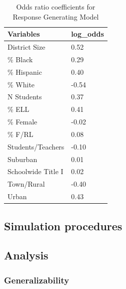 \documentclass[man,floatsintext]{apa6}
\begin{document}
\begin{table}[tbp]
\begin{center}
\begin{threeparttable}
\caption{\label{tab:tab-RGM-Pars}Odds ratio coefficients for Response Generating Model}
\begin{tabular}{ll}
\toprule
Variables & \multicolumn{1}{c}{log\_odds}\\
\midrule
District Size & 0.52\\
\% Black & 0.29\\
\% Hispanic & 0.40\\
\% White & -0.54\\
N Students & 0.37\\
\% ELL & 0.41\\
\% Female & -0.02\\
\% F/RL & 0.08\\
Students/Teachers & -0.10\\
Suburban & 0.01\\
Schoolwide Title I & 0.02\\
Town/Rural & -0.40\\
Urban & 0.43\\
\bottomrule
\end{tabular}
\end{threeparttable}
\end{center}
\end{table}



\hypertarget{simulation-procedures}{%
\subsection{Simulation procedures}\label{simulation-procedures}}


\hypertarget{analysis}{%
\subsection{Analysis}\label{analysis}}

\hypertarget{generalizability}{%
\subsubsection{Generalizability}\label{generalizability}}
\end{document}
